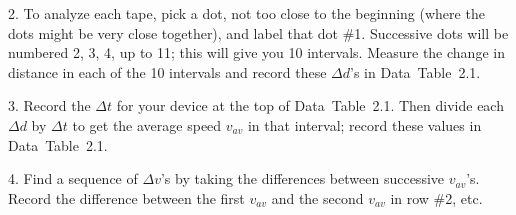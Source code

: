 \item{2.} To analyze each tape, pick a dot, not too close 
to the beginning (where the dots might be very close 
together), and label that dot \#1.  Successive dots will be 
numbered 2, 3, 4, up to 11; this will give you 10 intervals.
Measure the change in distance in each of the 10 intervals 
and record these $\Delta d$'s in Data~Table~2.1.

\item{3.} Record the $\Delta t$ for your device at the top
of Data~Table~2.1.  Then divide each $\Delta d$ by $\Delta t$
to get the average speed $v_{av}$ in that interval; record 
these values in Data~Table~2.1.

\item{4.} Find a sequence of $\Delta v$'s by taking the
differences between successive $v_{av}$'s.  Record the
difference between the first $v_{av}$ and the second
$v_{av}$ in row \#2, etc.

